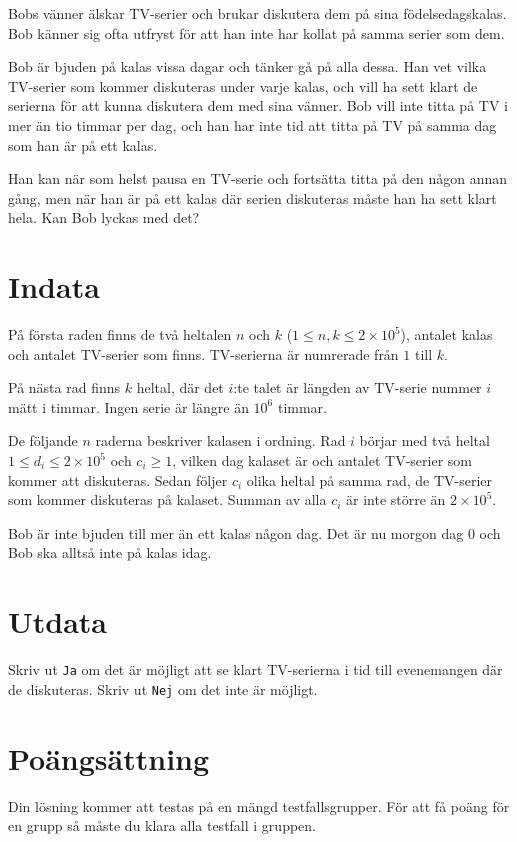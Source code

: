 Bobs vänner älskar TV-serier och brukar diskutera dem på sina födelsedagskalas. Bob känner sig ofta utfryst för att han inte har kollat på samma serier som dem.

Bob är bjuden på kalas vissa dagar och tänker gå på alla dessa. Han vet vilka TV-serier som kommer diskuteras under varje kalas, och vill ha sett klart de serierna för att kunna diskutera dem med sina vänner. Bob vill inte titta på TV i mer än tio timmar per dag, och han har inte tid att titta på TV på samma dag som han är på ett kalas.

Han kan när som helst pausa en TV-serie och fortsätta titta på den någon annan gång, men när han är på ett kalas där serien diskuteras måste han ha sett klart hela. Kan Bob lyckas med det?

\section*{Indata}
På första raden finns de två heltalen $n$ och $k$ ($1 \leq n,k \leq 2 \times 10^5$), antalet kalas och antalet TV-serier som finns. TV-serierna är numrerade från $1$ till $k$.

På nästa rad finns $k$ heltal, där det $i$:te talet är längden av TV-serie nummer $i$ mätt i timmar. Ingen serie är längre än $10^6$ timmar.

De följande $n$ raderna beskriver kalasen i ordning. Rad $i$ börjar med två heltal $1 \leq d_i \leq 2 \times 10^5$ och $c_i \ge 1$, vilken dag kalaset är och antalet TV-serier som kommer att diskuteras. Sedan följer $c_i$ olika heltal på samma rad, de TV-serier som kommer diskuteras på kalaset. Summan av alla $c_i$ är inte större än $2 \times 10^5$.

Bob är inte bjuden till mer än ett kalas någon dag. Det är nu morgon dag $0$ och Bob ska alltså inte på kalas idag.

\section*{Utdata}
Skriv ut \texttt{Ja} om det är möjligt att se klart TV-serierna i tid till evenemangen där de diskuteras. Skriv ut \texttt{Nej} om det inte är möjligt.

\section*{Poängsättning}
Din lösning kommer att testas på en mängd testfallsgrupper.
För att få poäng för en grupp så måste du klara alla testfall i gruppen.

